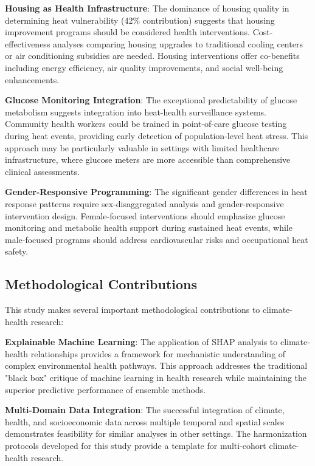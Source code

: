 \documentclass[journal,article,submit,pdftex,moreauthors]{Definitions/mdpi}
\begin{document}
\textbf{Housing as Health Infrastructure}: The dominance of housing quality in determining heat vulnerability (42\% contribution) suggests that housing improvement programs should be considered health interventions. Cost-effectiveness analyses comparing housing upgrades to traditional cooling centers or air conditioning subsidies are needed. Housing interventions offer co-benefits including energy efficiency, air quality improvements, and social well-being enhancements.

\textbf{Glucose Monitoring Integration}: The exceptional predictability of glucose metabolism suggests integration into heat-health surveillance systems. Community health workers could be trained in point-of-care glucose testing during heat events, providing early detection of population-level heat stress. This approach may be particularly valuable in settings with limited healthcare infrastructure, where glucose meters are more accessible than comprehensive clinical assessments.

\textbf{Gender-Responsive Programming}: The significant gender differences in heat response patterns require sex-disaggregated analysis and gender-responsive intervention design. Female-focused interventions should emphasize glucose monitoring and metabolic health support during sustained heat events, while male-focused programs should address cardiovascular risks and occupational heat safety.

\subsection{Methodological Contributions}

This study makes several important methodological contributions to climate-health research:

\textbf{Explainable Machine Learning}: The application of SHAP analysis to climate-health relationships provides a framework for mechanistic understanding of complex environmental health pathways. This approach addresses the traditional "black box" critique of machine learning in health research while maintaining the superior predictive performance of ensemble methods.

\textbf{Multi-Domain Data Integration}: The successful integration of climate, health, and socioeconomic data across multiple temporal and spatial scales demonstrates feasibility for similar analyses in other settings. The harmonization protocols developed for this study provide a template for multi-cohort climate-health research.
\end{document}
